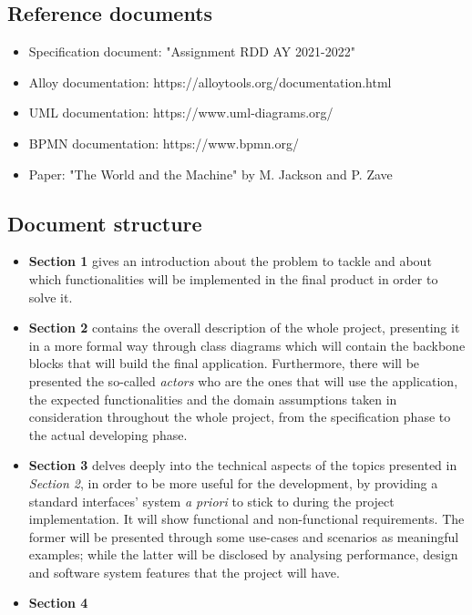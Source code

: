 \documentclass[table, 12pt]{article}
\begin{document}
\subsection{Reference documents}
\begin{itemize}
    \item Specification document: "Assignment RDD AY 2021-2022"
    \item Alloy documentation: https://alloytools.org/documentation.html
    \item UML documentation: https://www.uml-diagrams.org/
    \item BPMN documentation: https://www.bpmn.org/
    \item Paper: "The World and the Machine" by M. Jackson and P. Zave
\end{itemize}

\subsection{Document structure}
\begin{itemize}
    \item \textbf{Section 1} gives an introduction about the problem to tackle and about which functionalities will be implemented in the final product in order to solve it.
    \item \textbf{Section 2} contains the overall description of the whole project, presenting it in a more formal way through class diagrams which will contain the backbone blocks that will build the final application. Furthermore, there will be presented the so-called \emph{actors} who are the ones that will use the application, the expected functionalities and the domain assumptions taken in consideration throughout the whole project, from the specification phase to the actual developing phase.
    \item \textbf{Section 3} delves deeply into the technical aspects of the topics presented in \emph{Section 2}, in order to be more useful for the development, by providing a standard interfaces' system \textit{a priori} to  stick to during the project implementation. It will show functional and non-functional requirements. The former will be presented through some use-cases and scenarios as meaningful examples; while the latter will be disclosed by analysing performance, design and software system features that the project will have.
    \item \textbf{Section 4} 
\end{itemize}
\end{document}
